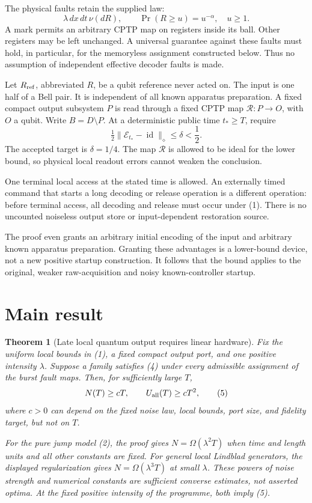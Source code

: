 \documentclass[11pt]{article}
\newtheorem{theorem}{Theorem}
\newcommand{\id}{\operatorname{id}}
\newcommand{\halfdiamond}[1]{\tfrac12\lVert #1\rVert_\diamond}
\begin{document}
The physical faults retain the supplied law:
\[
 \lambda\,dx\,dt\,\nu(dR),\qquad
 \Pr(R\geq u)=u^{-\alpha},\quad u\geq1.
 \tag{3}
\]
A mark permits an arbitrary CPTP map on registers inside its ball.
Other registers may be left unchanged. A universal guarantee against these
faults must hold, in particular, for the memoryless assignment constructed
below. Thus no assumption of independent effective decoder faults is made.

Let \(R_{\rm ref}\), abbreviated \(R\), be a qubit reference never acted
on. The input is one half of a Bell pair. It is independent of all known
apparatus preparation. A fixed compact output subsystem \(P\) is read
through a fixed CPTP map \(\mathcal R:P\to O\), with \(O\) a qubit. Write
\(B=D\setminus P\). At a deterministic public time \(t_*\geq T\), require
\[
 \halfdiamond{\mathcal E_{t_*}-\id}\leq\delta<\frac12.
 \tag{4}
\]
The accepted target is \(\delta=1/4\). The map \(\mathcal R\) is allowed
to be ideal for the lower bound, so physical local readout errors cannot
weaken the conclusion.

One terminal local access at the stated time is allowed. An externally
timed command that starts a long decoding or release operation is a
different operation: before terminal access, all decoding and release
must occur under (1). There is no uncounted noiseless output store or
input-dependent restoration source.

The proof even grants an arbitrary initial encoding of the input and
arbitrary known apparatus preparation. Granting these advantages is a
lower-bound device, not a new positive startup construction. It follows
that the bound applies to the original, weaker raw-acquisition and noisy
known-controller startup.

\section{Main result}

\begin{theorem}[Late local quantum output requires linear hardware]
\label{thm:main}
Fix the uniform local bounds in (1), a fixed compact output port, and one
positive intensity \(\lambda\). Suppose a family satisfies (4) under every
admissible assignment of the burst fault maps. Then, for sufficiently
large \(T\),
\[
 N(T)\geq cT,\qquad U_{\rm all}(T)\geq cT^2,
 \tag{5}
\]
where \(c>0\) can depend on the fixed noise law, local bounds, port size,
and fidelity target, but not on \(T\).

For the pure jump model (2), the proof gives
\(N=\Omega(\lambda^2 T)\) when time and length units and all other constants
are fixed. For general local Lindblad generators, the displayed
regularization gives \(N=\Omega(\lambda^3T)\) at small \(\lambda\).
These powers of noise strength and numerical constants are sufficient
converse estimates, not asserted optima. At the fixed positive intensity
of the programme, both imply (5).
\end{theorem}
\end{document}
